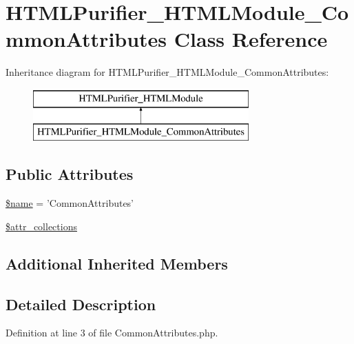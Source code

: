 \hypertarget{classHTMLPurifier__HTMLModule__CommonAttributes}{\section{H\+T\+M\+L\+Purifier\+\_\+\+H\+T\+M\+L\+Module\+\_\+\+Common\+Attributes Class Reference}
\label{classHTMLPurifier__HTMLModule__CommonAttributes}
}
Inheritance diagram for H\+T\+M\+L\+Purifier\+\_\+\+H\+T\+M\+L\+Module\+\_\+\+Common\+Attributes\+:\begin{figure}[H]
\begin{center}
\leavevmode
\includegraphics[height=2.000000cm]{classHTMLPurifier__HTMLModule__CommonAttributes}
\end{center}
\end{figure}
\subsection*{Public Attributes}
\begin{DoxyCompactItemize}
\item 
\hyperlink{classHTMLPurifier__HTMLModule__CommonAttributes_a065ed49304a046fe8e04e8f2b36339c2}{\$name} = 'Common\+Attributes'
\item 
\hyperlink{classHTMLPurifier__HTMLModule__CommonAttributes_abafc686db980efbef653bf7b4d63189a}{\$attr\+\_\+collections}
\end{DoxyCompactItemize}
\subsection*{Additional Inherited Members}


\subsection{Detailed Description}


Definition at line 3 of file Common\+Attributes.\+php.



